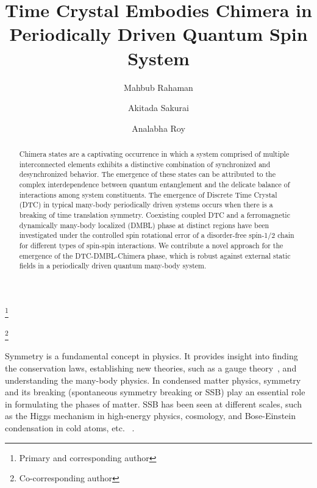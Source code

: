 \documentclass[%
reprint,
superscriptaddress,
amsmath,amssymb,showkeys,
aps,
prb,
]{revtex4-2}
\begin{document}
	
	\title{Time Crystal Embodies Chimera in Periodically Driven Quantum Spin System}
	
	\author{Mahbub Rahaman}
	\thanks{Primary and corresponding author}
	\author{Akitada Sakurai}
	\author{Analabha Roy}
	\thanks{Co-corresponding author}
	
	\begin{abstract}
		Chimera states are a captivating occurrence in which a system comprised of multiple interconnected elements exhibits a distinctive combination of synchronized and desynchronized behavior. The emergence of these states can be attributed to the complex interdependence between quantum entanglement and the delicate balance of interactions among system constituents. The emergence of Discrete Time Crystal (DTC) in typical many-body periodically driven systems occurs when there is a breaking of time translation symmetry. Coexisting coupled DTC and a ferromagnetic dynamically many-body localized (DMBL) phase at distinct regions have been investigated under the controlled spin rotational error of a disorder-free spin-1/2 chain for different types of spin-spin interactions. We contribute a novel approach for the emergence of the DTC-DMBL-Chimera phase, which is robust against external static fields in a periodically driven quantum many-body system.
	\end{abstract}
	
	\maketitle
	
	Symmetry is a fundamental concept in physics. It provides insight into finding the conservation laws, establishing new theories, such as a gauge theory~\cite{Yang_1954}, and understanding the many-body physics. In condensed matter physics, symmetry and its breaking (spontaneous symmetry breaking or SSB) play an essential role in formulating the phases of matter. SSB has been seen at different scales, such as the Higgs mechanism in high-energy physics, cosmology, and Bose-Einstein condensation in cold atoms, etc. ~\cite{krasnov_spontaneous_2012, sadler_spontaneous_2006, vanderbruggen_spontaneous_2015}.
	
\end{document}
